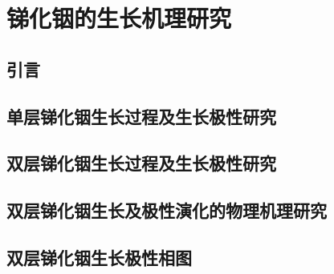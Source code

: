 \chapter{锑化铟的生长机理研究}
\section{引言}
\section{单层锑化铟生长过程及生长极性研究}
\section{双层锑化铟生长过程及生长极性研究}
\section{双层锑化铟生长及极性演化的物理机理研究}
\section{双层锑化铟生长极性相图}